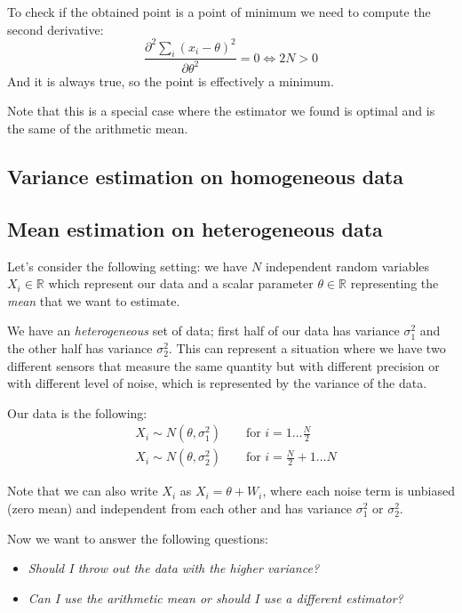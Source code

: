 To check if the obtained point is a point of minimum we need to compute the second derivative:
\[
    \frac{\partial^2 \sum_i(x_i-\theta)^2}{\partial \theta^2} = 0 \Leftrightarrow 2N > 0
\]
And it is always true, so the point is effectively a minimum.

Note that this is a special case where the estimator we found is optimal and is the same of the arithmetic mean.

\subsection{Variance estimation on homogeneous data}
\subsection{Mean estimation on heterogeneous data} \label{sec:ex_1}

Let's consider the following setting: we have $N$ independent random variables $X_i \in \mathbb{R}$ which represent our data and a scalar parameter $\theta \in \mathbb{R}$ representing the \textit{mean} that we want to estimate.

We have an \textit{heterogeneous} set of data; first half of our data has variance $\sigma_1^2$ and the other half has variance $\sigma_2^2$. This can represent a situation where we have two different sensors that measure the same quantity but with different precision or with different level of noise, which is represented by the variance of the data.

Our data is the following:
\begin{align*}
     & X_i \sim N(\theta, \sigma_1^2) \qquad \text{for } i = 1 \dots \frac{N}{2}     \\
     & X_i \sim N(\theta, \sigma_2^2) \qquad \text{for } i = \frac{N}{2} + 1 \dots N
\end{align*}

Note that we can also write $X_i$ as $X_i = \theta + W_i$, where each noise term is unbiased (zero mean) and independent from each other and has variance $\sigma_1^2$ or $\sigma_2^2$.

Now we want to answer the following questions:
\begin{itemize}
    \item \textit{Should I throw out the data with the higher variance?}
    \item \textit{Can I use the arithmetic mean or should I use a different estimator?}
\end{itemize}

